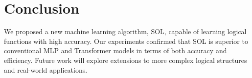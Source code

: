 \documentclass[11pt]{article}
\begin{document}
\section{Conclusion}
We proposed a new machine learning algorithm, SOL, capable of learning logical functions with high accuracy. Our experiments confirmed that SOL is superior to conventional MLP and Transformer models in terms of both accuracy and efficiency. Future work will explore extensions to more complex logical structures and real-world applications.
\end{document}
